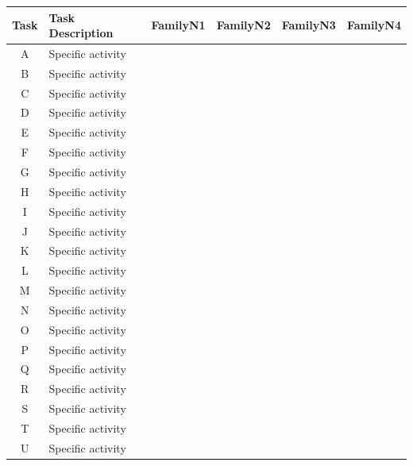 \begin{center}
\begin{tabular}{|c|l||c|c|c|c|}
\hline
Task & Task Description & FamilyN1 & FamilyN2 & FamilyN3 & FamilyN4\\
\hline
\hline
A & Specific activity & \cellcolor{gray!50} & \cellcolor{gray!50} &  & \\ \hline
B & Specific activity & \cellcolor{gray!50} &  & \cellcolor{gray!50} & \cellcolor{gray!50}\\ \hline
C & Specific activity &  & \cellcolor{gray!50} &  & \\ \hline
D & Specific activity &  &  & \cellcolor{gray!50} & \\ \hline
E & Specific activity &  &  &  & \cellcolor{gray!50}\\ \hline
F & Specific activity & \cellcolor{gray!50} &  &  & \\ \hline
G & Specific activity &  & \cellcolor{gray!50} &  & \\ \hline
H & Specific activity &  &  & \cellcolor{gray!50} & \\ \hline
I & Specific activity &  &  &  & \cellcolor{gray!50}\\ \hline
J & Specific activity & \cellcolor{gray!50} &  & \cellcolor{gray!50} & \\ \hline
K & Specific activity &  & \cellcolor{gray!50} & \cellcolor{gray!50} & \\ \hline
L & Specific activity &  &  & \cellcolor{gray!50} & \cellcolor{gray!50}\\ \hline
M & Specific activity & \cellcolor{gray!50} & \cellcolor{gray!50} &  & \cellcolor{gray!50}\\ \hline
N & Specific activity &  & \cellcolor{gray!50} &  & \cellcolor{gray!50}\\ \hline
O & Specific activity & \cellcolor{gray!50} &  & \cellcolor{gray!50} & \\ \hline
P & Specific activity & \cellcolor{gray!50} & \cellcolor{gray!50} &  & \\ \hline
Q & Specific activity & \cellcolor{gray!50} & \cellcolor{gray!50} & \cellcolor{gray!50} & \cellcolor{gray!50}\\ \hline
R & Specific activity & \cellcolor{gray!50} &  &  & \cellcolor{gray!50}\\ \hline
S & Specific activity &  &  & \cellcolor{gray!50} & \cellcolor{gray!50}\\ \hline
T & Specific activity &  & \cellcolor{gray!50} &  & \\ \hline
U & Specific activity &  &  & \cellcolor{gray!50} & \\ \hline
\end{tabular}
\end{center}
